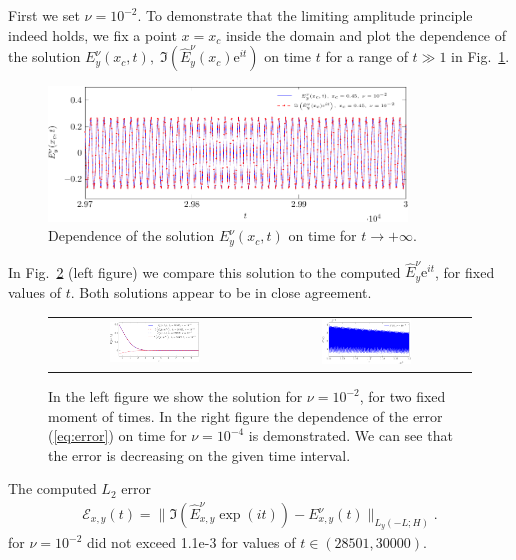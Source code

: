 First we set $\nu=10^{-2}$. To demonstrate that the limiting amplitude principle indeed holds, we fix a point $x=x_c$ 
inside the domain and plot the dependence of the solution $E_{y}^{\nu}(x_c,t), \; \Im\left(\hat{E}_y^{\nu}(x_c)\mathrm{e}^{it}\right)$ 
on time $t$ for a range of $t\gg 1$ in Fig.~\ref{fig:nu1e2_harmon}.  

\begin{figure}[htb]
\includegraphics[width=0.85\textwidth]{airy/figure_nu1e2-crop.pdf}
\caption{Dependence of the solution $E_{y}^{\nu}(x_c,t)$ on time for $t\rightarrow +\infty$.}
 \label{fig:nu1e2_harmon}
\end{figure}

In Fig.~\ref{fig:nu1e2_harmon2} (left figure) we compare this solution to the computed $\hat{E}_y^{\nu}\mathrm{e}^{it}$, for
fixed values of $t$. Both solutions appear to be in close agreement. 
\begin{figure}[htb]
 \begin{tabular}{cc}
\includegraphics[width=0.45\textwidth]{airy/figure_nu1e2_2-crop.pdf}
&
\includegraphics[width=0.45\textwidth]{airy/figure_error_nu1e4-crop.pdf}\\
\end{tabular}
\caption{In the left figure we show the solution for $\nu=10^{-2}$, for two fixed moment of times. In the right figure 
the dependence of the error (\ref{eq:error}) on time for $\nu=10^{-4}$ is demonstrated. 
We can see that the error is decreasing on the given time interval.}
 \label{fig:nu1e2_harmon2}
\end{figure}
\FloatBarrier
The computed $L_2$ error
\begin{align}
\label{eq:error}
\mathcal{E}_{x,y}(t)=\|\Im\left(\hat{E}_{x,y}^{\nu}\exp(it)\right)-E_{x,y}^{\nu}(t)\|_{L_{y}(-L;H)}.
\end{align}
for $\nu=10^{-2}$ did not exceed 1.1e-3 for values of $t\in \left(28501,  30000\right)$. 

